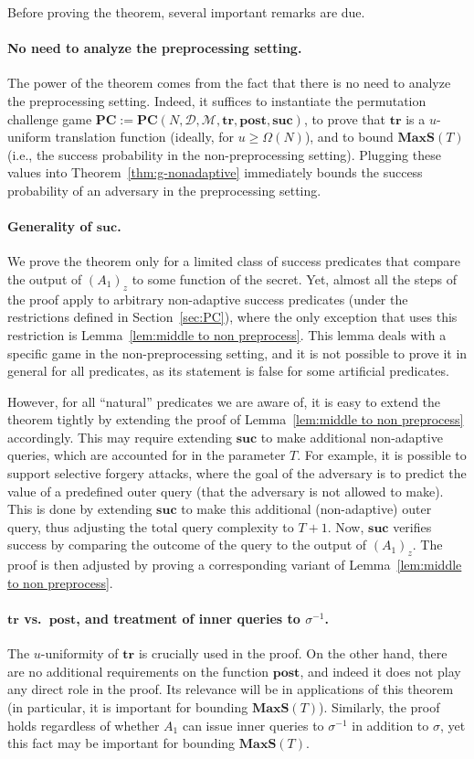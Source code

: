 \documentclass[11pt]{article}
\newcommand{\SECS}{{\mathcal{D}}}
\newcommand{\SUC}{\boldsymbol{suc}}
\newcommand{\TR}{\boldsymbol{tr}}
\newcommand{\POST}{\boldsymbol{post}}
\newcommand{\PC}{\boldsymbol{PC}}
\newcommand{\MAXS}{\boldsymbol{MaxS}}
\begin{document}
Before proving the theorem, several important remarks are due.
\paragraph{No need to analyze the preprocessing setting.} The power of the theorem comes from the fact that there is no need to analyze the preprocessing setting. Indeed, it suffices 
to instantiate the permutation challenge game 
$\PC := \PC(N,\SECS,\mathcal{M},\TR,\POST,\SUC)$, to
prove that $\TR$ is a $u$-uniform translation function (ideally, for $u \geq \Omega(N)$), and to bound 
$\MAXS(T)$ (i.e., the success probability in the non-preprocessing setting). 
Plugging these values into Theorem~\ref{thm:g-nonadaptive}
immediately bounds the success probability of an adversary in the preprocessing setting.

\paragraph{Generality of $\SUC$.}
We prove the theorem only for a limited class of success predicates 
that compare the output of $(A_1)_z$ to some function of the secret.
Yet, almost all the steps of the proof apply to  arbitrary non-adaptive success predicates (under the restrictions defined in Section~\ref{sec:PC}),
where the only exception that uses this restriction is Lemma~\ref{lem:middle to non preprocess}. 
This lemma deals with a specific game in the non-preprocessing setting,
and it is not possible to prove it in general for all predicates,
as its statement is false for some artificial predicates.

However, for all ``natural'' predicates we are aware of, 
it is easy to extend the theorem tightly by extending the proof 
of Lemma~\ref{lem:middle to non preprocess} accordingly. 
This may require extending $\SUC$ to make additional non-adaptive queries, which are accounted for in the parameter $T$.
For example, it is possible to support selective forgery attacks,
where the goal of the adversary is to predict the value of a predefined outer query 
(that the adversary is not allowed to make). 
This is done by extending $\SUC$ to make this additional (non-adaptive) outer query,
thus adjusting the total query complexity to $T+1$.
Now, $\SUC$ verifies success by comparing the outcome of the query to the output of $(A_1)_z$.
The proof is then adjusted by proving a corresponding variant of Lemma~\ref{lem:middle to non preprocess}.

\paragraph{$\TR$ vs.~$\POST$, and treatment of inner queries to $\sigma^{-1}$.}
The $u$-uniformity of $\TR$ is crucially used in the proof. On the other hand, there are no additional requirements on 
the function $\POST$, and indeed it does not play any direct role in the proof. Its relevance will be in applications of this theorem (in particular, it is important for bounding $\MAXS(T)$).
Similarly, the proof holds regardless of whether $A_1$ can issue inner queries to $\sigma^{-1}$ in addition to $\sigma$, yet this fact may be important for bounding $\MAXS(T)$. 
\end{document}
